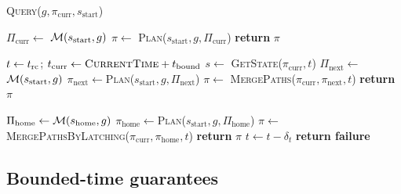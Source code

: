 \documentclass[conference]{IEEEtran}
\begin{document}
\begin{algorithm}[t]
\caption{\textsc{Query}($g, \pi_{\textrm{curr}},s_{\textrm{start}}$)}\label{alg:query}  
\begin{algorithmic}[1]
        \State $\Pi_{\textrm{curr}} \leftarrow$ $\mathcal{M}(s_{\textrm{start}},g)$ 
        \State $\pi \leftarrow$ \textsc{Plan}($s_{\textrm{start}},g,\Pi_{\textrm{curr}}$)
        \State \textbf{return} $\pi$
    \EndIf

\vspace{2mm}

\State $t \leftarrow t_{\textrm{rc}}$; \hspace{3mm} $t_{\textrm{curr}}\leftarrow \textsc{CurrentTime} + t_{\textrm{bound}}$
    \State $s \leftarrow$ \textsc{GetState}($\pi_{\textrm{curr}}, t$)
    \State $\Pi_{\textrm{next}} \leftarrow$ $\mathcal{M}(s_{\textrm{start}},g)$ 
        \State $\pi_{\textrm{next}} \leftarrow$\textsc{Plan}($s_{\textrm{start}},g,\Pi_{\textrm{next}}$)
        \State $\pi \leftarrow$ \textsc{MergePaths}($\pi_{\textrm{curr}},\pi_{\textrm{next}},t$)
        \State \textbf{return} $\pi$
    \EndIf

\vspace{2mm}

    \State $\Pi_{\textrm{home}} \leftarrow \mathcal{M} (s_{\textrm{home}},g)$
            \State $\pi_{\textrm{home}} \leftarrow$\textsc{Plan}($s_{\textrm{start}},g,\Pi_{\textrm{home}}$)
            \State $\pi \leftarrow$ \textsc{MergePathsByLatching}($\pi_{\textrm{curr}},\pi_{\textrm{home}}, t$)
            \State \textbf{return} $\pi$
        \EndIf
    \EndIf
    \State $t \leftarrow t - \delta_t$
\EndWhile
\State \textbf{return failure}
\end{algorithmic}
\end{algorithm}




\subsection{Bounded-time guarantees}
\end{document}

